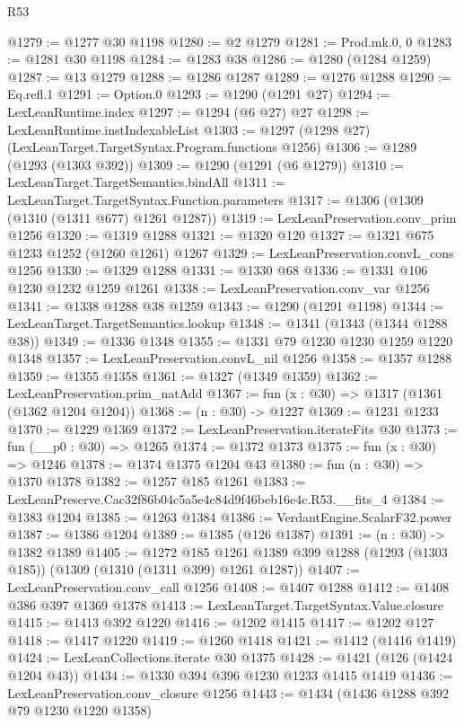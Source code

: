 \begin{lexlean}{R53}
\begin{coremodule}
@1279 := @1277 @30 @1198
@1280 := @2 @1279
@1281 := Prod.mk.{0, 0}
@1283 := @1281 @30 @1198
@1284 := @1283 @38
@1286 := @1280 (@1284 @1259)
@1287 := @13 @1279
@1288 := @1286 @1287
@1289 := @1276 @1288
@1290 := Eq.refl.{1}
@1291 := Option.{0}
@1293 := @1290 (@1291 @27)
@1294 := LexLeanRuntime.index
@1297 := @1294 (@6 @27) @27
@1298 := LexLeanRuntime.instIndexableList
@1303 := @1297 (@1298 @27) (LexLeanTarget.TargetSyntax.Program.functions @1256)
@1306 := @1289 (@1293 (@1303 @392))
@1309 := @1290 (@1291 (@6 @1279))
@1310 := LexLeanTarget.TargetSemantics.bindAll
@1311 := LexLeanTarget.TargetSyntax.Function.parameters
@1317 := @1306 (@1309 (@1310 (@1311 @677) @1261 @1287))
@1319 := LexLeanPreservation.conv_prim @1256
@1320 := @1319 @1288
@1321 := @1320 @120
@1327 := @1321 @675 @1233 @1252 (@1260 @1261) @1267
@1329 := LexLeanPreservation.convL_cons @1256
@1330 := @1329 @1288
@1331 := @1330 @68
@1336 := @1331 @106 @1230 @1232 @1259 @1261
@1338 := LexLeanPreservation.conv_var @1256
@1341 := @1338 @1288 @38 @1259
@1343 := @1290 (@1291 @1198)
@1344 := LexLeanTarget.TargetSemantics.lookup
@1348 := @1341 (@1343 (@1344 @1288 @38))
@1349 := @1336 @1348
@1355 := @1331 @79 @1230 @1230 @1259 @1220 @1348
@1357 := LexLeanPreservation.convL_nil @1256
@1358 := @1357 @1288
@1359 := @1355 @1358
@1361 := @1327 (@1349 @1359)
@1362 := LexLeanPreservation.prim_natAdd
@1367 := fun (x : @30) => @1317 (@1361 (@1362 @1204 @1204))
@1368 := (n : @30) -> @1227
@1369 := @1231 @1233
@1370 := @1229 @1369
@1372 := LexLeanPreservation.iterateFits @30
@1373 := fun (__p0 : @30) => @1265
@1374 := @1372 @1373
@1375 := fun (x : @30) => @1246
@1378 := @1374 @1375 @1204 @43
@1380 := fun (n : @30) => @1370 @1378
@1382 := @1257 @185 @1261
@1383 := LexLeanPreserve.Cac32f86b04c5a5e4c84d9f46beb16e4c.R53.__fits_4
@1384 := @1383 @1204
@1385 := @1263 @1384
@1386 := VerdantEngine.ScalarF32.power
@1387 := @1386 @1204
@1389 := @1385 (@126 @1387)
@1391 := (n : @30) -> @1382 @1389
@1405 := @1272
    @185
    @1261
    @1389
    @399
    @1288
    (@1293 (@1303 @185))
    (@1309 (@1310 (@1311 @399) @1261 @1287))
@1407 := LexLeanPreservation.conv_call @1256
@1408 := @1407 @1288
@1412 := @1408 @386 @397 @1369 @1378
@1413 := LexLeanTarget.TargetSyntax.Value.closure
@1415 := @1413 @392 @1220
@1416 := @1202 @1415
@1417 := @1202 @127
@1418 := @1417 @1220
@1419 := @1260 @1418
@1421 := @1412 (@1416 @1419)
@1424 := LexLeanCollections.iterate @30 @1375
@1428 := @1421 (@126 (@1424 @1204 @43))
@1434 := @1330 @394 @396 @1230 @1233 @1415 @1419
@1436 := LexLeanPreservation.conv_closure @1256
@1443 := @1434 (@1436 @1288 @392 @79 @1230 @1220 @1358)

\end{coremodule}
\end{lexlean}

